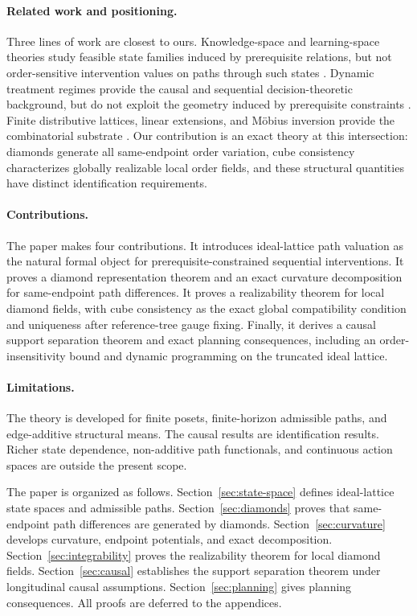\documentclass{article}
\theoremstyle{definition}
\begin{document}
\paragraph{Related work and positioning.}
Three lines of work are closest to ours. Knowledge-space and learning-space theories study feasible state families induced by prerequisite relations, but not order-sensitive intervention values on paths through such states \cite{doignon1999,doignon2011}. Dynamic treatment regimes provide the causal and sequential decision-theoretic background, but do not exploit the geometry induced by prerequisite constraints \cite{robins1986,robins1987,murphy2003,murphy2005,qian2011}. Finite distributive lattices, linear extensions, and M\"obius inversion provide the combinatorial substrate \cite{birkhoff1937,davey2002,trotter1992,pruesse1994,rota1964,stanley2011ec1}. Our contribution is an exact theory at this intersection: diamonds generate all same-endpoint order variation, cube consistency characterizes globally realizable local order fields, and these structural quantities have distinct identification requirements.

\paragraph{Contributions.}
The paper makes four contributions. It introduces ideal-lattice path valuation as the natural formal object for prerequisite-constrained sequential interventions. It proves a diamond representation theorem and an exact curvature decomposition for same-endpoint path differences. It proves a realizability theorem for local diamond fields, with cube consistency as the exact global compatibility condition and uniqueness after reference-tree gauge fixing. Finally, it derives a causal support separation theorem and exact planning consequences, including an order-insensitivity bound and dynamic programming on the truncated ideal lattice.

\paragraph{Limitations.}
The theory is developed for finite posets, finite-horizon admissible paths, and edge-additive structural means. The causal results are identification results. Richer state dependence, non-additive path functionals, and continuous action spaces are outside the present scope.

The paper is organized as follows. Section~\ref{sec:state-space} defines ideal-lattice state spaces and admissible paths. Section~\ref{sec:diamonds} proves that same-endpoint path differences are generated by diamonds. Section~\ref{sec:curvature} develops curvature, endpoint potentials, and exact decomposition. Section~\ref{sec:integrability} proves the realizability theorem for local diamond fields. Section~\ref{sec:causal} establishes the support separation theorem under longitudinal causal assumptions. Section~\ref{sec:planning} gives planning consequences. All proofs are deferred to the appendices.
\end{document}
